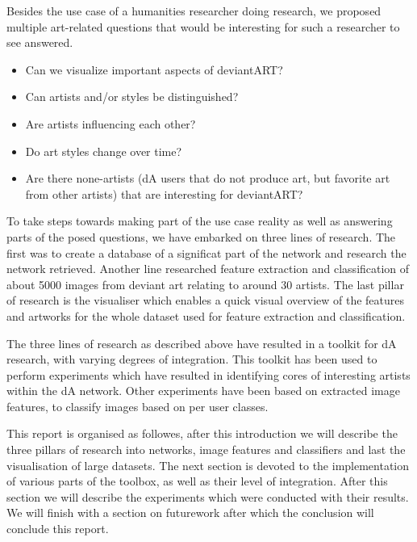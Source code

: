 Besides the use case of a humanities researcher doing research, we proposed multiple art-related questions that would be interesting for such a researcher to see answered.
\begin{itemize}
\item Can we visualize important aspects of deviantART?
\item Can artists and/or styles be distinguished?
\item Are artists influencing each other?
\item Do art styles change over time?
\item Are there none-artists (dA users that do not produce art, but favorite art from other artists) that are interesting for deviantART?
\end{itemize}

To take steps towards making part of the use case reality as well as answering parts of the posed questions, we have embarked on three lines of research. The first was to create a database of a significat part of the network and research the network retrieved. Another line researched feature extraction and classification of about 5000 images from deviant art relating to around 30 artists. The last pillar of research is the visualiser which enables a quick visual overview of the features and artworks for the whole dataset used for feature extraction and classification.

The three lines of research as described above have resulted in a toolkit for dA research, with varying degrees of integration. This toolkit has been used to perform experiments which have resulted in identifying cores of interesting artists within the dA network. Other experiments have been based on extracted image features, to classify images based on per user classes.

This report is organised as followes, after this introduction we will describe the three pillars of research into networks, image features and classifiers and last the visualisation of large datasets. The next section is devoted to the implementation of various parts of the toolbox, as well as their level of integration. After this section we will describe the experiments which were conducted with their results. We will finish with a section on futurework after which the conclusion will conclude this report. 


